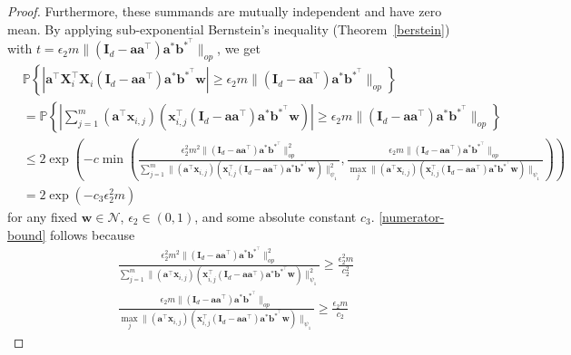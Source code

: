 \documentclass{article}
\theoremstyle{plain}
\theoremstyle{definition}
\theoremstyle{remark}
\begin{document}
\begin{proof}
Furthermore, these summands are mutually independent and have zero mean. By applying sub-exponential Bernstein's inequality (Theorem~\ref{berstein}) with $t=\epsilon_2 m \lVert (\mathbf{I}_d - \mathbf{a}\mathbf{a}^\top) \mathbf{a}^*\mathbf{b}^{*^\top}\rVert_{op}$, we get
\begin{align}
    &\mathbb{P} \left\{ \left| \mathbf{a}^\top \mathbf{X}_i^\top \mathbf{X}_i (\mathbf{I}_d - \mathbf{a}\mathbf{a}^\top)\mathbf{a}^*\mathbf{b}^{*^\top}\mathbf{w} \right|  \geq \epsilon_2 m \lVert (\mathbf{I}_d - \mathbf{a}\mathbf{a}^\top ) \mathbf{a}^*\mathbf{b}^{*^\top}\rVert_{op}\right\} \\&= \mathbb{P} \left\{ \left|\sum_{j=1}^{m} (\mathbf{a}^\top \mathbf{x}_{i,j})(\mathbf{x}_{i,j}^\top(\mathbf{I}_d - \mathbf{a}\mathbf{a}^\top)\mathbf{a}^*\mathbf{b}^{*^\top}\mathbf{w})\right|  \geq \epsilon_2 m \lVert (\mathbf{I}_d - \mathbf{a}\mathbf{a}^\top ) \mathbf{a}^*\mathbf{b}^{*^\top}\rVert_{op}\right\}  \\ 
    & \leq 2\exp\left(-c \min \left(\frac{\epsilon_2^2 m^2 \lVert (\mathbf{I}_d - \mathbf{a}\mathbf{a}^\top ) \mathbf{a}^*\mathbf{b}^{*^\top}\rVert_{op}^2}{\sum_{j=1}^{m} \| (\mathbf{a}^\top \mathbf{x}_{i,j}) (\mathbf{x}_{i,j}^\top(\mathbf{I}_d - \mathbf{a}\mathbf{a}^\top)\mathbf{a}^*\mathbf{b}^{*^\top}\mathbf{w})\|^2_{\psi_1}}  ,  \frac{\epsilon_2 m \lVert (\mathbf{I}_d - \mathbf{a}\mathbf{a}^\top ) \mathbf{a}^*\mathbf{b}^{*^\top}\rVert_{op}}{\max_j \| (\mathbf{a}^\top \mathbf{x}_{i,j}) (\mathbf{x}_{i,j}^\top(\mathbf{I}_d - \mathbf{a}\mathbf{a}^\top)\mathbf{a}^*\mathbf{b}^{*^\top}\mathbf{w})\|_{\psi_1}} \right) \right) \\
    &= 2\exp{(-c_3 \epsilon_2^2 m )}   \label{numerator-bound}
\end{align}
for any fixed $\mathbf w \in \mathcal N$, $\epsilon_2 \in (0,1)$, and some absolute constant $c_3$. \eqref{numerator-bound} follows because 
\begin{align}
    \frac{\epsilon_2^2 m^2 \lVert (\mathbf{I}_d - \mathbf{a}\mathbf{a}^\top ) \mathbf{a}^*\mathbf{b}^{*^\top}\rVert_{op}^2}{\sum_{j=1}^{m} \| (\mathbf{a}^\top \mathbf{x}_{i,j}) (\mathbf{x}_{i,j}^\top(\mathbf{I}_d - \mathbf{a}\mathbf{a}^\top)\mathbf{a}^*\mathbf{b}^{*^\top}\mathbf{w})\|^2_{\psi_1}} \geq \frac{\epsilon_2^2 m}{c_2^2} \\
    \frac{\epsilon_2 m \lVert (\mathbf{I}_d - \mathbf{a}\mathbf{a}^\top ) \mathbf{a}^*\mathbf{b}^{*^\top}\rVert_{op}}{\max_j \| (\mathbf{a}^\top \mathbf{x}_{i,j}) (\mathbf{x}_{i,j}^\top(\mathbf{I}_d - \mathbf{a}\mathbf{a}^\top)\mathbf{a}^*\mathbf{b}^{*^\top}\mathbf{w})\|_{\psi_1}} \geq \frac{\epsilon_2 m }{c_2}

\end{align}
\end{proof}
\end{document}

